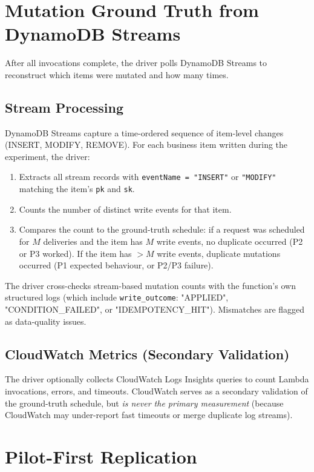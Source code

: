 \section{Mutation Ground Truth from DynamoDB Streams}

After all invocations complete, the driver polls DynamoDB Streams to reconstruct which items were mutated and how many times.

\subsection{Stream Processing}

DynamoDB Streams capture a time-ordered sequence of item-level changes (INSERT, MODIFY, REMOVE). For each business item written during the experiment, the driver:

\begin{enumerate}
    \item Extracts all stream records with \texttt{eventName = "INSERT"} or \texttt{"MODIFY"} matching the item's \texttt{pk} and \texttt{sk}.
    \item Counts the number of distinct write events for that item.
    \item Compares the count to the ground-truth schedule: if a request was scheduled for $M$ deliveries and the item has $M$ write events, no duplicate occurred (P2 or P3 worked). If the item has $>M$ write events, duplicate mutations occurred (P1 expected behaviour, or P2/P3 failure).
\end{enumerate}

The driver cross-checks stream-based mutation counts with the function's own structured logs (which include \texttt{write\_outcome}: "APPLIED", "CONDITION\_FAILED", or "IDEMPOTENCY\_HIT"). Mismatches are flagged as data-quality issues.

\subsection{CloudWatch Metrics (Secondary Validation)}

The driver optionally collects CloudWatch Logs Insights queries to count Lambda invocations, errors, and timeouts. CloudWatch serves as a secondary validation of the ground-truth schedule, but \textit{is never the primary measurement} (because CloudWatch may under-report fast timeouts or merge duplicate log streams).

\section{Pilot-First Replication}

